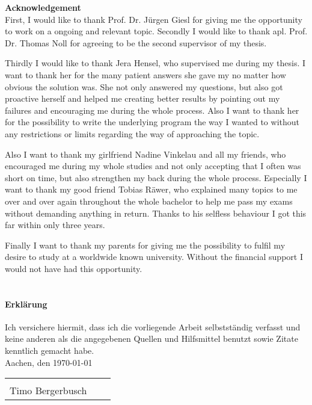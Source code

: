 {\bf\Large Acknowledgement} \\ [1em] 

First, I would like to thank Prof. Dr. Jürgen Giesl for giving me the opportunity to work on a ongoing and relevant topic.
Secondly I would like to thank apl. Prof. Dr. Thomas Noll for agreeing to be the second supervisor of my thesis.

Thirdly I would like to thank Jera Hensel, who supervised me during my thesis. I want to thank her for the many patient answers she gave my no matter how obvious the solution was. She not only answered my questions, but also got proactive herself and helped me creating better results by pointing out my failures and encouraging me during the whole process. Also I want to thank her for the possibility to write the underlying program the way I wanted to without any restrictions or limits regarding the way of approaching the topic. 

Also I want to thank my girlfriend Nadine Vinkelau and all my friends, who encouraged me during my whole studies and not only accepting that I often was short on time, but also strengthen my back during the whole process. Especially I want to thank my good friend Tobias Räwer, who explained many topics to me over and over again throughout the whole bachelor to help me pass my exams without demanding anything in return. Thanks to his selfless behaviour I got this far within only three years.

Finally I want to thank my parents for giving me the possibility to fulfil my desire to study at a worldwide known university. Without the financial support I would not have had this opportunity. \\ \\

\paragraph{Erklärung} Ich versichere hiermit, dass ich die vorliegende Arbeit selbstständig verfasst und keine
anderen als die angegebenen Quellen und Hilfsmittel benutzt sowie Zitate kenntlich
gemacht habe.\newline \\
Aachen, den \today

\begin{tabular}{lp{2em}l} 
	\hspace{4cm} \\\cline{1-1}\cline{3-3} 
	Timo Bergerbusch
\end{tabular}
